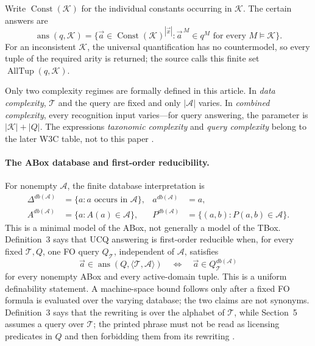 Write \(\operatorname{Const}(\mathcal K)\) for the individual constants
occurring in \(\mathcal K\).  The certain answers are
\[
 \operatorname{ans}(q,\mathcal K)
 =\{\vec a\in\operatorname{Const}(\mathcal K)^{|\vec x|}:
    \vec a^{\,M}\in q^M
    \text{ for every }M\models\mathcal K\}.
\]
For an inconsistent \(\mathcal K\), the universal quantification has no
countermodel, so every tuple of the required arity is returned; the source
calls this finite set \(\operatorname{AllTup}(q,\mathcal K)\).

Only two complexity regimes are formally defined in this article.  In
\emph{data complexity}, \(\mathcal T\) and the query are fixed and only
\(|\mathcal A|\) varies.  In \emph{combined complexity}, every recognition
input varies---for query answering, the parameter is
\(|\mathcal K|+|Q|\).  The expressions \emph{taxonomic complexity} and
\emph{query complexity} belong to the later W3C table, not to this paper
\cite[\S\S2.3--2.4]{CalvaneseEtAl2007}.

\paragraph{The ABox database and first-order reducibility.}
For nonempty \(\mathcal A\), the finite database interpretation is
\[
\begin{aligned}
 \Delta^{db(\mathcal A)}&=\{a:a\text{ occurs in }\mathcal A\},&
 a^{db(\mathcal A)}&=a,\\
 A^{db(\mathcal A)}&=\{a:A(a)\in\mathcal A\},&
 P^{db(\mathcal A)}&=\{(a,b):P(a,b)\in\mathcal A\}.
\end{aligned}
\]
This is a minimal model of the ABox, not generally a model of the TBox.
Definition~3 says that UCQ answering is first-order reducible when, for every
fixed \(\mathcal T,Q\), one FO query \(Q_{\mathcal T}\), independent of
\(\mathcal A\), satisfies
\[
 \vec a\in\operatorname{ans}
   (Q,\langle\mathcal T,\mathcal A\rangle)
 \quad\Longleftrightarrow\quad
 \vec a\in Q_{\mathcal T}^{db(\mathcal A)}
\]
for every nonempty ABox and every active-domain tuple.  This is a uniform
definability statement.  A machine-space bound follows only after a fixed FO
formula is evaluated over the varying database; the two claims are not
synonyms.  Definition~3 says that the rewriting is over the alphabet of
\(\mathcal T\), while Section~5 assumes a query over \(\mathcal T\); the
printed phrase must not be read as licensing predicates in \(Q\) and then
forbidding them from its rewriting \cite[\S2.5]{CalvaneseEtAl2007}.

